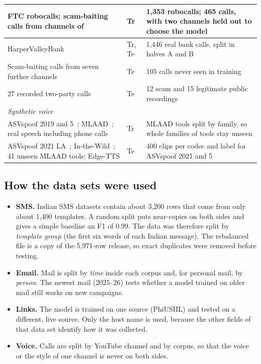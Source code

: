 {{\begin{longtable}{|p{5.0cm}|p{1.0cm}|p{7.7cm}|}
FTC robocalls; scam-baiting calls from channels of~\cite{bhupendra2023scambait} & Tr & 1{,}353 robocalls; 465 calls, with two channels held out to choose the model \\ \hline
HarperValleyBank~\cite{wu2020harpervalley} & Tr, Te & 1{,}446 real bank calls, split in halves A and B \\ \hline
Scam-baiting calls from seven further channels & Te & 105 calls never seen in training \\ \hline
27 recorded two-party calls & Te & 12 scam and 15 legitimate public recordings \\ \hline
\multicolumn{3}{|l|}{\textit{Synthetic voice}} \\ \hline
ASVspoof 2019 and 5~\cite{wang2020asvspoof2019,wang2024asvspoof5}; MLAAD~\cite{muller2024mlaad}; real speech including phone calls & Tr & MLAAD tools split by family, so whole families of tools stay unseen \\ \hline
ASVspoof 2021 LA~\cite{liu2023asvspoof2021}; In-the-Wild~\cite{muller2022itw}; 41 unseen MLAAD tools; Edge-TTS & Te & 400 clips per codec and label for ASVspoof 2021 and 5 \\ \hline
\end{longtable}
}

\subsection{How the data sets were used}
\begin{itemize}
\item \textbf{SMS.} Indian SMS datasets contain about 3{,}200 rows that come from only about 1{,}400 templates. A random split puts near-copies on both sides and gives a simple baseline an F1 of 0.99. The data was therefore split by \emph{template group} (the first six words of each Indian message). The rebalanced file is a copy of the 5{,}971-row release, so exact duplicates were removed before testing.
\item \textbf{Email.} Mail is split by \emph{time} inside each corpus and, for personal mail, by \emph{person}. The newest mail (2025--26) tests whether a model trained on older mail still works on new campaigns.
\item \textbf{Links.} The model is trained on one source (PhiUSIIL) and tested on a different, live source. Only the host name is used, because the other fields of that data set identify how it was collected.
\item \textbf{Voice.} Calls are split by YouTube channel and by corpus, so that the voice or the style of one channel is never on both sides.
\end{itemize}

}
